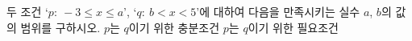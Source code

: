 두 조건 `$p:\ -3\le x\le a$', `$q:\ b<x<5$'에 대하여 다음을 만족시키는 실수 $a$, $b$의 값의 범위를 구하시오. 
 $p$는 $q$이기 위한 충분조건
 $p$는 $q$이기 위한 필요조건
